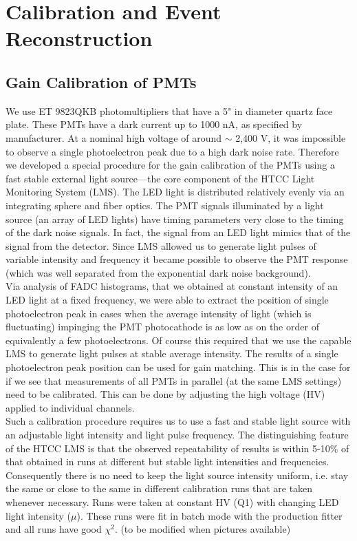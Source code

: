 \section{Calibration and Event Reconstruction}
\subsection{Gain Calibration of PMTs} We use ET 9823QKB photomultipliers that have a 5" in diameter quartz face plate. These PMTs have a dark current up to 1000 nA, as specified by manufacturer. At a nominal high voltage of around $\sim$ 2,400 V, it was impossible to observe a single photoelectron peak due to a high dark noise rate. Therefore we developed a special procedure for the gain calibration of the PMTs using a fast stable external light source---the core component of the HTCC Light Monitoring System (LMS). The LED light is distributed relatively evenly via an integrating sphere and fiber optics. The PMT signals illuminated by a light source (an array of LED lights) have timing parameters very close to the timing of the dark noise signals. In fact, the signal from an LED light mimics that of the signal from the detector. Since LMS allowed us to generate light pulses of variable intensity and frequency it became possible to observe the PMT response (which was well separated from the exponential dark noise background). \\
\indent Via analysis of FADC histograms, that we obtained at constant intensity of an LED light at a fixed frequency, we were able to extract the  position of single photoelectron peak in cases when the average intensity of light (which is fluctuating) impinging the PMT photocathode is as low as on the order of equivalently a few photoelectrons. Of course this required that we use the capable LMS to generate light pulses at stable average intensity. The results of a single photoelectron peak position can be used for gain matching. This is in the case for if we see that measurements of all PMTs in parallel (at the same LMS settings) need to be calibrated. This can be done by adjusting the high voltage (HV) applied to individual channels. \\
\indent Such a calibration procedure requires us to use a fast and stable light source with an adjustable light intensity and light pulse frequency. The distinguishing feature of the HTCC LMS is that the observed repeatability of results is within 5-10\% of that obtained in runs at different but stable light intensities and frequencies. Consequently there is no need to keep the light source intensity uniform, i.e. stay the same or close to the same in different calibration runs that are taken whenever necessary. Runs were taken at constant HV (Q1) with changing LED light intensity ($\mu$). These runs were fit in batch mode with the production fitter and all runs have good $\chi{^2}$. (to be modified when pictures available) 

